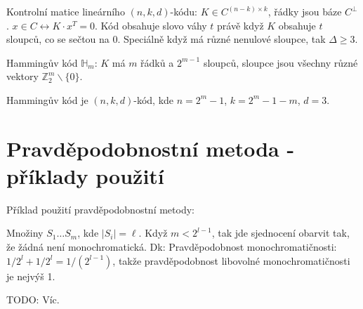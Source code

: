 \documentclass[a4paper,10pt,titlepage]{article} \usepackage[utf8]{inputenc}
\def\Z{\mathbb{Z}}
\begin{document}
Kontrolní matice lineárního $(n,k,d)$-kódu: $K\in C^{(n-k)\times k}$, řádky
jsou báze $C^\perp$. $x\in C\leftrightarrow K\cdot x^T=0$. Kód obsahuje slovo
váhy $t$ právě když $K$ obsahuje $t$ sloupců, co se sečtou na 0.
Speciálně když má různé nenulové sloupce, tak $\Delta\geq 3$.

Hammingův kód $\mathbb{H}_m$: $K$ má $m$ řádků a $2^{m-1}$ sloupců,
sloupce jsou všechny různé vektory $\Z_2^m\smallsetminus\{0\}$.

Hammingův kód je $(n,k,d)$-kód, kde $n=2^m-1$, $k=2^m-1-m$, $d=3$.

\section{Pravděpodobnostní metoda - příklady použití}
\vykradeno

Příklad použití pravděpodobnostní metody:

Množiny $S_1\ldots S_m$, kde $|S_i|=\ell$. Když $m<2^{l-1}$, tak jde sjednocení
obarvit tak, že žádná není monochromatická.
Dk: Pravděpodobnost monochromatičnosti: $1/2^l + 1/2^l = 1/(2^{l-1})$,
takže pravděpodobnost libovolné monochromatičnosti je nejvýš 1.

TODO: Víc.
\end{document}
